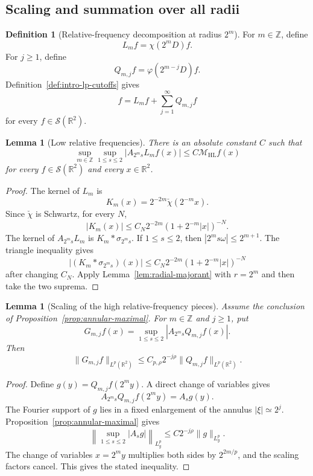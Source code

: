 \documentclass[11pt]{article}
\numberwithin{equation}{section}
\newtheorem{lemma}[theorem]{Lemma}
\theoremstyle{definition}
\newtheorem{definition}[theorem]{Definition}
\theoremstyle{remark}
\newcommand{\R}{\mathbb R}
\newcommand{\Z}{\mathbb Z}
\newcommand{\Sch}{\mathcal S}
\newcommand{\MHL}{\mathcal M_{\mathrm{HL}}}
\begin{document}
\subsection{Scaling and summation over all radii}

\begin{definition}[Relative-frequency decomposition at radius $2^m$]\label{def:relative-frequency}
For $m\in\Z$, define
\[
L_mf=\chi(2^mD)f.
\]
For $j\ge1$, define
\[
Q_{m,j}f=\varphi(2^{m-j}D)f.
\]
Definition~\ref{def:intro-lp-cutoffs} gives
\[
f=L_mf+\sum_{j=1}^{\infty}Q_{m,j}f
\]
for every $f\in\Sch(\R^2)$.
\end{definition}

\begin{lemma}[Low relative frequencies]\label{lem:low-relative-frequency}
There is an absolute constant $C$ such that
\[
\sup_{m\in\Z}\sup_{1\le s\le2}|A_{2^ms}L_mf(x)|\le C\MHL f(x)
\]
for every $f\in\Sch(\R^2)$ and every $x\in\R^2$.
\end{lemma}

\begin{proof}
The kernel of $L_m$ is
\[
K_m(x)=2^{-2m}\check\chi(2^{-m}x).
\]
Since $\check\chi$ is Schwartz, for every $N$,
\[
|K_m(x)|\le C_N2^{-2m}(1+2^{-m}|x|)^{-N}.
\]
The kernel of $A_{2^ms}L_m$ is $K_m*\sigma_{2^ms}$.  If $1\le s\le2$, then $|2^ms\omega|\le2^{m+1}$.  The triangle inequality gives
\[
|(K_m*\sigma_{2^ms})(x)|\le C_N2^{-2m}(1+2^{-m}|x|)^{-N}
\]
after changing $C_N$.  Apply Lemma~\ref{lem:radial-majorant} with $r=2^m$ and then take the two suprema.
\end{proof}

\begin{lemma}[Scaling of the high relative-frequency pieces]\label{lem:high-frequency-scaling}
Assume the conclusion of Proposition~\ref{prop:annular-maximal}.  For $m\in\Z$ and $j\ge1$, put
\[
G_{m,j}f(x)=\sup_{1\le s\le2}|A_{2^ms}Q_{m,j}f(x)|.
\]
Then
\[
\|G_{m,j}f\|_{L^p(\R^2)}
\le C_{p,\rho}2^{-j\rho}\|Q_{m,j}f\|_{L^p(\R^2)}.
\]
\end{lemma}

\begin{proof}
Define $g(y)=Q_{m,j}f(2^my)$.  A direct change of variables gives
\[
A_{2^ms}Q_{m,j}f(2^my)=A_sg(y).
\]
The Fourier support of $g$ lies in a fixed enlargement of the annulus $|\xi|\simeq2^j$.  Proposition~\ref{prop:annular-maximal} gives
\[
\left\|\sup_{1\le s\le2}|A_sg|\right\|_{L^p_y}
\le C2^{-j\rho}\|g\|_{L^p_y}.
\]
The change of variables $x=2^my$ multiplies both sides by $2^{2m/p}$, and the scaling factors cancel.  This gives the stated inequality.
\end{proof}
\end{document}
